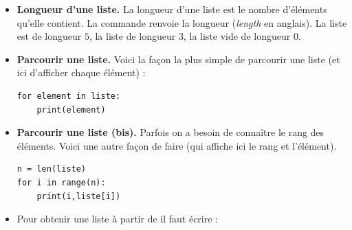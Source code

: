 \documentclass[11pt,class=report,crop=false]{standalone}
\begin{document}
\begin{cours}[Liste (2)]
\sauteligne
\begin{itemize}
  \item \textbf{Longueur d'une liste.} La longueur d'une liste est le nombre d'éléments qu'elle contient. La commande  renvoie la longueur (\emph{length} en anglais). La liste \ci{[5,4,3,2,1]} est de longueur $5$, la liste  de longueur $3$, la liste vide \ci{[]} de longueur $0$.
  
  \item \textbf{Parcourir une liste.} 
	Voici la façon la plus simple de parcourir une liste (et ici d'afficher chaque élément) :
\begin{lstlisting}
for element in liste:
    print(element)
\end{lstlisting}

  \item \textbf{Parcourir une liste (bis).} 
  Parfois on a besoin de connaître le rang des éléments. Voici une autre façon de faire (qui affiche ici le rang et l'élément).
\begin{lstlisting}
n = len(liste)
for i in range(n):
    print(i,liste[i])
\end{lstlisting}  

\item Pour obtenir une liste à partir de  il faut écrire :\\
\centerline{}
\end{itemize}
\end{cours}


\end{document}
